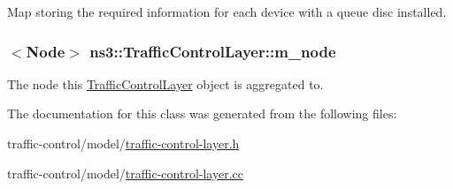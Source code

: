 Map storing the required information for each device with a queue disc installed. 

\subsubsection[{\texorpdfstring{m\+\_\+node}{m_node}}]{$<${\bf Node}$>$ ns3\+::\+Traffic\+Control\+Layer\+::m\+\_\+node\hspace{0.3cm}{\ttfamily [private]}}\hypertarget{classns3_1_1TrafficControlLayer_a6892507af633ef1fb7e1e0a50b54f0f2}{}\label{classns3_1_1TrafficControlLayer_a6892507af633ef1fb7e1e0a50b54f0f2}


The node this \hyperlink{classns3_1_1TrafficControlLayer}{Traffic\+Control\+Layer} object is aggregated to. 



The documentation for this class was generated from the following files\+:\begin{DoxyCompactItemize}
\item 
traffic-\/control/model/\hyperlink{traffic-control-layer_8h}{traffic-\/control-\/layer.\+h}\item 
traffic-\/control/model/\hyperlink{traffic-control-layer_8cc}{traffic-\/control-\/layer.\+cc}\end{DoxyCompactItemize}
